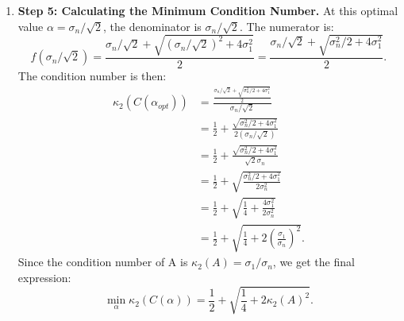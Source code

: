\begin{solution}
\begin{enumerate}
    Solving for this optimal $\alpha$:
    \begin{align*}
    \alpha &= \frac{\sqrt{\alpha^2 + 4\sigma_n^2} - \alpha}{2} \\
    2\alpha &= \sqrt{\alpha^2 + 4\sigma_n^2} - \alpha \\
    3\alpha &= \sqrt{\alpha^2 + 4\sigma_n^2} \\
    (3\alpha)^2 &= \alpha^2 + 4\sigma_n^2 \quad (\text{squaring both sides}) \\
    9\alpha^2 &= \alpha^2 + 4\sigma_n^2 \\
    8\alpha^2 &= 4\sigma_n^2 \\
    \alpha^2 &= \frac{\sigma_n^2}{2} \implies \alpha = \frac{\sigma_n}{\sqrt{2}}.
    \end{align*}

    \item \textbf{Step 5: Calculating the Minimum Condition Number.}
    At this optimal value $\alpha = \sigma_n/\sqrt{2}$, the denominator is $\sigma_n/\sqrt{2}$. The numerator is:
    \[ f(\sigma_n/\sqrt{2}) = \frac{\sigma_n/\sqrt{2} + \sqrt{(\sigma_n/\sqrt{2})^2 + 4\sigma_1^2}}{2} = \frac{\sigma_n/\sqrt{2} + \sqrt{\sigma_n^2/2 + 4\sigma_1^2}}{2}. \]
    The condition number is then:
    \begin{align*}
    \kappa_2(C(\alpha_{opt})) &= \frac{\frac{\sigma_n/\sqrt{2} + \sqrt{\sigma_n^2/2 + 4\sigma_1^2}}{2}}{\sigma_n/\sqrt{2}} \\
    &= \frac{1}{2} + \frac{\sqrt{\sigma_n^2/2 + 4\sigma_1^2}}{2(\sigma_n/\sqrt{2})} \\
    &= \frac{1}{2} + \frac{\sqrt{\sigma_n^2/2 + 4\sigma_1^2}}{\sqrt{2}\sigma_n} \\
    &= \frac{1}{2} + \sqrt{\frac{\sigma_n^2/2 + 4\sigma_1^2}{2\sigma_n^2}} \\
    &= \frac{1}{2} + \sqrt{\frac{1}{4} + \frac{4\sigma_1^2}{2\sigma_n^2}} \\
    &= \frac{1}{2} + \sqrt{\frac{1}{4} + 2\left(\frac{\sigma_1}{\sigma_n}\right)^2}.
    \end{align*}
    Since the condition number of A is $\kappa_2(A) = \sigma_1/\sigma_n$, we get the final expression:
    \[ \min_{\alpha}\kappa_2(C(\alpha)) = \frac{1}{2} + \sqrt{\frac{1}{4} + 2\kappa_2(A)^2}. \]


\end{enumerate}
\end{solution}
